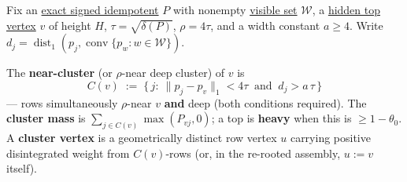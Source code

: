 \hypertarget{def:near-cluster}{}%
\begin{definition}\label{def:near-cluster}
Fix an \hyperref[def:signed-idempotent]{exact signed idempotent} $P$ with nonempty
\hyperref[def:visible-set]{visible set} $\mathcal W$, a \hyperref[def:height]{hidden top vertex} $v$ of height $H$,
$\tau=\sqrt{\delta(P)}$, $\rho=4\tau$, and a width constant $a\ge4$. Write
$d_j=\operatorname{dist}_1(p_j,\operatorname{conv}\{p_w:w\in\mathcal W\})$.

The \textbf{near-cluster} (or $\rho$-near deep cluster) of $v$ is
\[C(v)\;:=\;\{\,j:\ \lVert p_j-p_v\rVert_1<4\tau\ \text{ and }\ d_j>a\,\tau\,\}\]
--- rows simultaneously $\rho$-near $v$ \textbf{and} deep (both conditions required). The \textbf{cluster mass}
is $\sum_{j\in C(v)}\max(P_{vj},0)$; a top is \textbf{heavy} when this is $\ge1-\theta_0$. A
\textbf{cluster vertex} is a geometrically distinct row vertex $u$ carrying positive disintegrated weight
from $C(v)$-rows (or, in the re-rooted assembly, $u:=v$ itself).
\end{definition}
